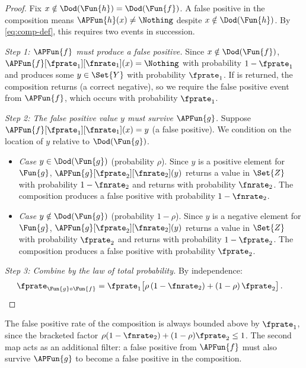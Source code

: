 \documentclass[ ../main.tex]{subfiles}
\begin{document}
\begin{proof}
Fix $x \notin \Dod(\Fun{h}) = \Dod(\Fun{f})$.
A false positive in the composition means
$\APFun{h}(x) \neq \Nothing$ despite $x \notin \Dod(\Fun{h})$.
By \cref{eq:comp-def}, this requires two events in
succession.

\emph{Step 1: $\APFun{f}$ must produce a false positive.}
Since $x \notin \Dod(\Fun{f})$,
$\APFun{f}[\fprate_1][\fnrate_1](x) = \Nothing$ with probability
$1 - \fprate_1$ and produces some $y \in \Set{Y}$ with probability
$\fprate_1$.  If \Nothing is returned, the composition returns
\Nothing (a correct negative), so we require the false positive event
from $\APFun{f}$, which occurs with probability $\fprate_1$.

\emph{Step 2: The false positive value $y$ must survive
$\APFun{g}$.}
Suppose $\APFun{f}[\fprate_1][\fnrate_1](x) = y$ (a false positive).
We condition on the location of $y$ relative to $\Dod(\Fun{g})$.

\begin{itemize}
\item \emph{Case $y \in \Dod(\Fun{g})$} (probability $\rho$).
Since $y$ is a positive element for $\Fun{g}$,
$\APFun{g}[\fprate_2][\fnrate_2](y)$ returns a value in $\Set{Z}$
with probability $1 - \fnrate_2$ and returns \Nothing with probability
$\fnrate_2$.  The composition produces a false positive with probability $1 - \fnrate_2$.

\item \emph{Case $y \notin \Dod(\Fun{g})$} (probability $1-\rho$).
Since $y$ is a negative element for $\Fun{g}$,
$\APFun{g}[\fprate_2][\fnrate_2](y)$ returns a value in $\Set{Z}$
with probability $\fprate_2$ and returns \Nothing with probability
$1 - \fprate_2$.  The composition produces a false positive with
probability $\fprate_2$.
\end{itemize}

\emph{Step 3: Combine by the law of total probability.}
By independence:
\begin{align}
\fprate_{\Fun{g} \circ \Fun{f}}
  &= \fprate_1
     \bigl[\rho\,(1-\fnrate_2) + (1-\rho)\,\fprate_2\bigr]\,.
     \label{eq:fpr-derivation}
\end{align}
\end{proof}

\begin{remark}
The false positive rate of the composition is always bounded above by
$\fprate_1$, since the bracketed factor
$\rho(1-\fnrate_2)+(1-\rho)\fprate_2 \leq 1$.  The second map acts
as an additional filter: a false positive from $\APFun{f}$ must also
survive $\APFun{g}$ to become a false positive in the composition.
\end{remark}
\end{document}
